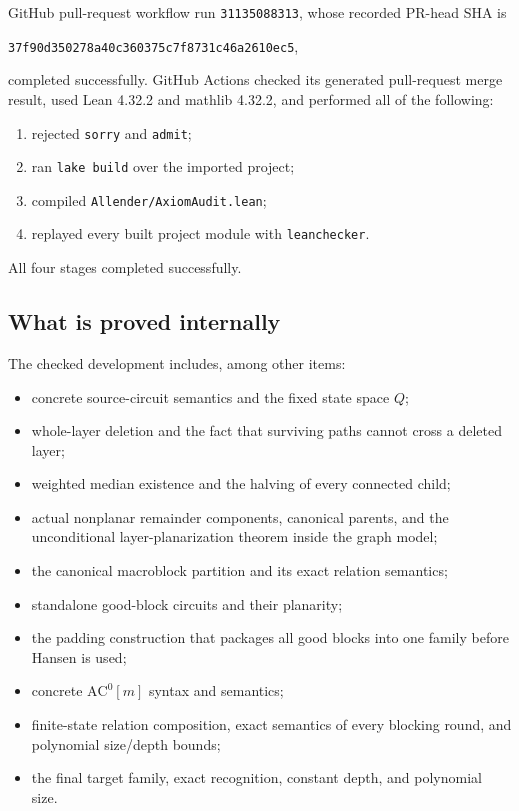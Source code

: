 \documentclass[11pt]{article}
\theoremstyle{definition}
\newcommand{\ACm}[1]{\mathrm{AC}^{0}[#1]}
\begin{document}
GitHub pull-request workflow run \texttt{31135088313}, whose recorded PR-head
SHA is\par\noindent
\nolinkurl{37f90d350278a40c360375c7f8731c46a2610ec5},\par\noindent
completed successfully.  GitHub Actions checked its generated pull-request
merge result, used Lean 4.32.2 and mathlib 4.32.2, and performed all of the
following:
\begin{enumerate}
  \item rejected \texttt{sorry} and \texttt{admit};
  \item ran \texttt{lake build} over the imported project;
  \item compiled \texttt{Allender/AxiomAudit.lean};
  \item replayed every built project module with \texttt{leanchecker}.
\end{enumerate}
All four stages completed successfully.

\subsection{What is proved internally}

The checked development includes, among other items:
\begin{itemize}
  \item concrete source-circuit semantics and the fixed state space $Q$;
  \item whole-layer deletion and the fact that surviving paths cannot cross a
        deleted layer;
  \item weighted median existence and the halving of every connected child;
  \item actual nonplanar remainder components, canonical parents, and the
        unconditional layer-planarization theorem inside the graph model;
  \item the canonical macroblock partition and its exact relation semantics;
  \item standalone good-block circuits and their planarity;
  \item the padding construction that packages all good blocks into one
        family before Hansen is used;
  \item concrete $\ACm{m}$ syntax and semantics;
  \item finite-state relation composition, exact semantics of every blocking
        round, and polynomial size/depth bounds;
  \item the final target family, exact recognition, constant depth, and
        polynomial size.
\end{itemize}
\end{document}

